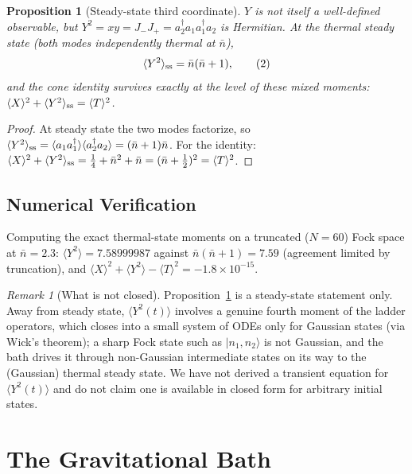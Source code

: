 \documentclass[12pt]{amsart}
\theoremstyle{plain}
\newtheorem{proposition}[theorem]{Proposition}
\theoremstyle{remark}
\newtheorem*{remark}{Remark}
\begin{document}
\begin{proposition}[Steady-state third coordinate]\label{prop:Y2}
$Y$ is not itself a well-defined observable, but $Y^2=xy=J_-J_+=a_2^\dagger a_1a_1^\dagger a_2$ is Hermitian. At the thermal steady state (both modes independently thermal at $\bar n$),
\begin{equation}
\langle Y^2\rangle_{\rm ss}=\bar n(\bar n+1), \tag{2}
\end{equation}
and the cone identity survives exactly at the level of these mixed moments: $\langle X\rangle^2+\langle Y^2\rangle_{\rm ss}=\langle T\rangle^2$.
\end{proposition}

\begin{proof}
At steady state the two modes factorize, so $\langle Y^2\rangle_{\rm ss}=\langle a_1a_1^\dagger\rangle\langle a_2^\dagger a_2\rangle=(\bar n+1)\bar n$. For the identity: $\langle X\rangle^2+\langle Y^2\rangle_{\rm ss}=\tfrac14+\bar n^2+\bar n=(\bar n+\tfrac12)^2=\langle T\rangle^2$.
\end{proof}

\subsection*{Numerical Verification}
Computing the exact thermal-state moments on a truncated ($N=60$) Fock space at $\bar n=2.3$: $\langle Y^2\rangle=7.58999987$ against $\bar n(\bar n+1)=7.59$ (agreement limited by truncation), and $\langle X\rangle^2+\langle Y^2\rangle-\langle T\rangle^2=-1.8\times10^{-15}$.

\begin{remark}[What is not closed]
Proposition~\ref{prop:Y2} is a steady-state statement only. Away from steady state, $\langle Y^2(t)\rangle$ involves a genuine fourth moment of the ladder operators, which closes into a small system of ODEs only for Gaussian states (via Wick's theorem); a sharp Fock state such as $|n_1,n_2\rangle$ is not Gaussian, and the bath drives it through non-Gaussian intermediate states on its way to the (Gaussian) thermal steady state. We have not derived a transient equation for $\langle Y^2(t)\rangle$ and do not claim one is available in closed form for arbitrary initial states.
\end{remark}

\section{The Gravitational Bath}
\end{document}
